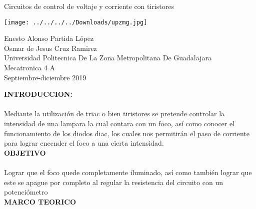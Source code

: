 \documentclass[12pt]{report}
\begin{document}
 
\begin{center}
{\Huge Circuitos de control de voltaje y corriente con tiristores}
\end{center}
\begin{center}
\texttt{[image: ../../../../Downloads/upzmg.jpg]} 
\end{center} 
{\Huge Enesto Alonso Partida López\\Osmar de Jesus Cruz Ramirez\\ Universidad Politecnica De La Zona Metropolitana De Guadalajara\\ Mecatronica 4 A\\ Septiembre-diciembre 2019}
\date{3 de noviembre  2019}
 
\newpage

{\huge \textbf{INTRODUCCION:}\\}\\


{\large Mediante la utilización de triac o bien tiristores se pretende controlar la intensidad de una lampara la cual contara con un foco, así como conocer el funcionamiento de los diodos diac, los cuales nos permitirán el paso de corriente para lograr encender el foco a una cierta intensidad.}\\
 

{\huge \textbf{OBJETIVO}\\}\\


{\large Lograr que el foco quede completamente iluminado, así como también lograr que este se apague por completo al regular la resistencia del circuito con un potenciómetro }\\



{\huge \textbf{MARCO TEORICO}\\}\\
\end{document}
